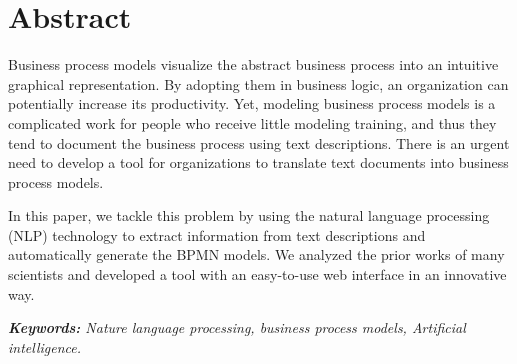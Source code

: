 \chapter*{Abstract}
\noindent

Business process models visualize the abstract business process into an intuitive graphical representation. By adopting them in business logic, an organization can potentially increase its productivity. Yet, modeling business process models is a complicated work for people who receive little modeling training, and thus they tend to document the business process using text descriptions. There is an urgent need to develop a tool for organizations to translate text documents into business process models. 

In this paper, we tackle this problem by using the natural language processing (NLP) technology to extract information from text descriptions and automatically generate the BPMN models. We analyzed the prior works of many scientists and developed a tool with an easy-to-use web interface in an innovative way.

\textit{\textbf{Keywords: }Nature language processing, business process models, Artificial intelligence. }
